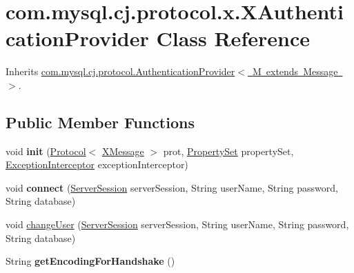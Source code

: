 \hypertarget{classcom_1_1mysql_1_1cj_1_1protocol_1_1x_1_1_x_authentication_provider}{}\section{com.\+mysql.\+cj.\+protocol.\+x.\+X\+Authentication\+Provider Class Reference}
\label{classcom_1_1mysql_1_1cj_1_1protocol_1_1x_1_1_x_authentication_provider}


Inherits \mbox{\hyperlink{interfacecom_1_1mysql_1_1cj_1_1protocol_1_1_authentication_provider}{com.\+mysql.\+cj.\+protocol.\+Authentication\+Provider$<$ M extends Message $>$}}.

\subsection*{Public Member Functions}
\begin{DoxyCompactItemize}
\item 
\mbox{\label{classcom_1_1mysql_1_1cj_1_1protocol_1_1x_1_1_x_authentication_provider_a628e0d6b6faff2dec99b4ddb9f7cbb58}} 
void {\bfseries init} (\mbox{\hyperlink{interfacecom_1_1mysql_1_1cj_1_1protocol_1_1_protocol}{Protocol}}$<$ \mbox{\hyperlink{classcom_1_1mysql_1_1cj_1_1protocol_1_1x_1_1_x_message}{X\+Message}} $>$ prot, \mbox{\hyperlink{interfacecom_1_1mysql_1_1cj_1_1conf_1_1_property_set}{Property\+Set}} property\+Set, \mbox{\hyperlink{interfacecom_1_1mysql_1_1cj_1_1exceptions_1_1_exception_interceptor}{Exception\+Interceptor}} exception\+Interceptor)
\item 
\mbox{\label{classcom_1_1mysql_1_1cj_1_1protocol_1_1x_1_1_x_authentication_provider_a1454c94a9b23f6302cc37a2efa714b9d}} 
void {\bfseries connect} (\mbox{\hyperlink{interfacecom_1_1mysql_1_1cj_1_1protocol_1_1_server_session}{Server\+Session}} server\+Session, String user\+Name, String password, String database)
\item 
void \mbox{\hyperlink{classcom_1_1mysql_1_1cj_1_1protocol_1_1x_1_1_x_authentication_provider_afd444d5b0926e61a8b14b6300aa739cc}{change\+User}} (\mbox{\hyperlink{interfacecom_1_1mysql_1_1cj_1_1protocol_1_1_server_session}{Server\+Session}} server\+Session, String user\+Name, String password, String database)
\item 
\mbox{\label{classcom_1_1mysql_1_1cj_1_1protocol_1_1x_1_1_x_authentication_provider_adf03df5479398541ea3039c50956db0f}} 
String {\bfseries get\+Encoding\+For\+Handshake} ()
\end{DoxyCompactItemize}
